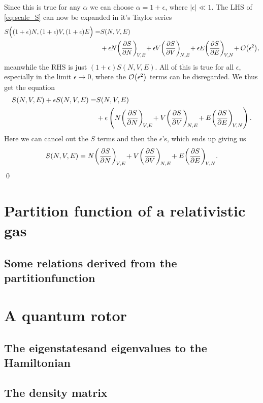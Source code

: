 \documentclass[11pt,letter, swedish, english
]{article}
\begin{document}
Since this is true for any $\alpha$ we can choose $\alpha=1+\epsilon$,
where $|\epsilon|\ll1$\footnotemark{}. The LHS of \eqref{eq:scale_S}
can now be expanded in it's Taylor series
\begin{equation}
\begin{aligned}
S\Big((1+\epsilon) N, (1+\epsilon) V, (1+\epsilon) E\Big) =& 
S(N, V, E)\\
&+ \epsilon N\qty(\pdv{S}{N})_{\!V,E}\!
+ \epsilon V\qty(\pdv{S}{V})_{\!N,E}\!
+ \epsilon E\qty(\pdv{S}{E})_{\!V,N}\!
+ \order{\epsilon^2},
\end{aligned}
\end{equation}
meanwhile the RHS is just $(1+\epsilon)S(N, V, E)$.
All of this is true for all $\epsilon$, especially in the limit
$\epsilon\to0$, where the $\order{\epsilon^2}$ terms can be
disregarded. We thus get the equation
\begin{equation}
\begin{aligned}
S(N, V, E) + \epsilon S(N, V, E) =&
S(N, V, E)\\
&+\epsilon
\left(N\qty(\pdv{S}{N})_{\!V,E}\!
+ V\qty(\pdv{S}{V})_{\!N,E}\!
+ E\qty(\pdv{S}{E})_{\!V,N}\right).
\end{aligned}
\end{equation}
Here we can cancel out the $S$ terms and then the $\epsilon$'s, which
ends up giving us
\begin{equation}
S(N, V, E) =
N\qty(\pdv{S}{N})_{\!V,E}\!
+ V\qty(\pdv{S}{V})_{\!N,E}\!
+ E\qty(\pdv{S}{E})_{\!V,N}.
\end{equation}
\qed


\section{Partition function of a relativistic gas}



\subsection*{Some relations derived from the partitionfunction}



\section{A quantum rotor}

\subsection{The eigenstatesand eigenvalues to the Hamiltonian}


\subsection{The density matrix}
\end{document}
